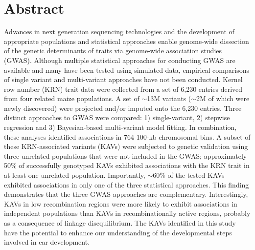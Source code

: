 \documentclass[10pt,letterpaper]{article}
\begin{document}

\section*{Abstract}
Advances in next generation sequencing technologies and the development of appropriate populations and statistical approaches enable genome-wide dissection of the genetic determinants of traits via genome-wide association studies (GWAS). Although multiple statistical approaches for conducting GWAS are available and many have been tested using simulated data, empirical comparisons of single variant and multi-variant approaches have not been conducted. Kernel row number (KRN) trait data were collected from a set of 6,230 entries derived from four related maize populations. A set of $\sim$13M variants ($\sim$2M of which were newly discovered) were projected and/or imputed onto the 6,230 entries. Three distinct approaches to GWAS were compared: 1) single-variant, 2) stepwise regression and 3) Bayesian-based multi-variant model fitting. In combination, these analyses identified associations in 764 100-kb chromosomal bins. A subset of these KRN-associated variants (KAVs) were subjected to genetic validation using three unrelated populations that were not included in the GWAS; approximately 50\% of successfully genotyped KAVs exhibited associations with the KRN trait in at least one unrelated population. Importantly, $\sim$60\% of the tested KAVs exhibited associations in only one of the three statistical approaches. This finding demonstrates that the three GWAS approaches are complementary. Interestingly, KAVs in low recombination regions were more likely to exhibit associations in independent populations than KAVs in recombinationally active regions, probably as a consequence of linkage disequilibrium. The KAVs identified in this study have the potential to enhance our understanding of the developmental steps involved in ear development.

\end{document}
